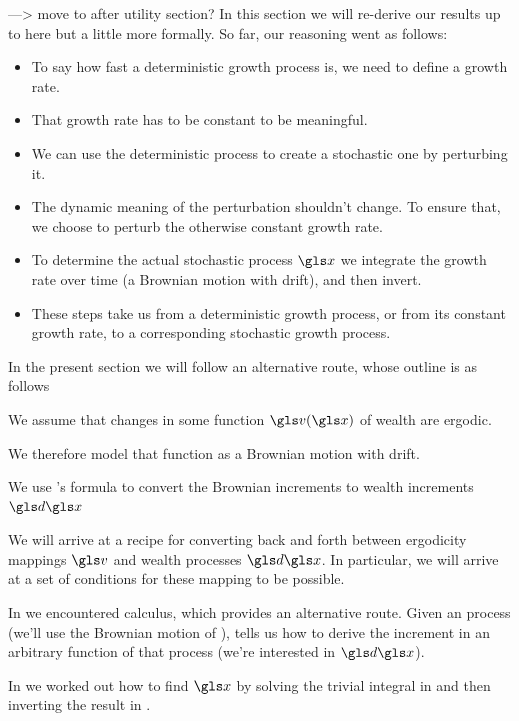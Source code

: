  ---> move to after utility section? 
In this section we will re-derive our results up to here but a little more formally. So far, our reasoning went as follows:
\begin{itemize}
\item
To say how fast a deterministic growth process is, we need to define a growth rate.

\item
That growth rate has to be constant to be meaningful.

\item
We can use the deterministic process to create a stochastic one by perturbing it.

\item
The dynamic meaning of the perturbation shouldn't change. To ensure that, we choose to perturb the otherwise constant growth rate.

\item
To determine the actual stochastic process $\x$ we integrate the growth rate over time (a Brownian motion with drift), and then invert.

\item
These steps take us from a deterministic growth process, or from its constant growth rate, to a corresponding stochastic growth process.
\end{itemize}
In the present section we will follow an alternative route, whose outline is as follows

We assume that changes in some function $\gv(\x)$ of wealth are ergodic.

We therefore model that function as a Brownian motion with drift.

We use \Ito's formula to convert the Brownian increments to wealth increments $\gd\x$

We will arrive at a recipe for converting back and forth between ergodicity mappings $\gv$ 
and wealth processes $\gd\x$. In particular, we will arrive at a set of conditions for these mapping to be possible.

In \secref{} we encountered \Ito calculus, which provides an alternative route. Given an \Ito process (we'll use the Brownian motion of \eref{}), 
\Ito tells us how to derive the increment in an arbitrary function of that process (we're interested in $\gd\x$).

In  we worked out how to find $\x$ by solving the trivial integral in  and then inverting the result in . 

